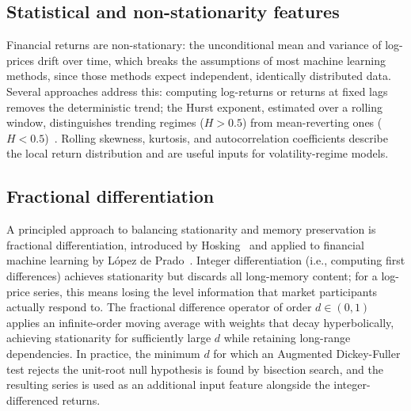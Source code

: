 \subsection{Statistical and non-stationarity features}
Financial returns are non-stationary: the unconditional mean and variance of log-prices drift over time, which breaks the assumptions of most machine learning methods, since those methods expect independent, identically distributed data. Several approaches address this: computing log-returns or returns at fixed lags removes the deterministic trend; the Hurst exponent, estimated over a rolling window, distinguishes trending regimes ($H > 0.5$) from mean-reverting ones ($H < 0.5$)~\cite{sewell2011characterization}. Rolling skewness, kurtosis, and autocorrelation coefficients describe the local return distribution and are useful inputs for volatility-regime models.

\subsection{Fractional differentiation}
A principled approach to balancing stationarity and memory preservation is fractional differentiation, introduced by Hosking~\cite{hosking1981fractional} and applied to financial machine learning by L{\'o}pez de Prado~\cite{lopezdeprado2018advances}. Integer differentiation (i.e., computing first differences) achieves stationarity but discards all long-memory content; for a log-price series, this means losing the level information that market participants actually respond to. The fractional difference operator of order $d \in (0, 1)$ applies an infinite-order moving average with weights that decay hyperbolically, achieving stationarity for sufficiently large $d$ while retaining long-range dependencies. In practice, the minimum $d$ for which an Augmented Dickey-Fuller test rejects the unit-root null hypothesis is found by bisection search, and the resulting series is used as an additional input feature alongside the integer-differenced returns.


